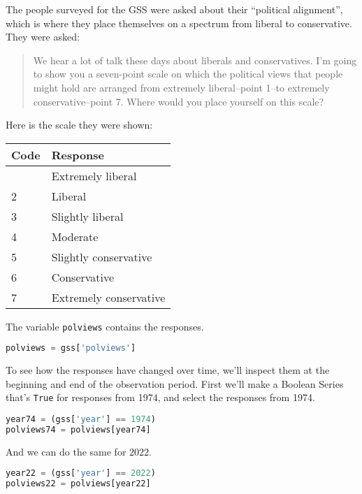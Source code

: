 The people surveyed for the GSS were asked about their ``political
alignment'', which is where they place themselves on a spectrum from
liberal to conservative. They were asked:

\begin{quote}
We hear a lot of talk these days about liberals and conservatives. I'm
going to show you a seven-point scale on which the political views that
people might hold are arranged from extremely liberal--point 1--to
extremely conservative--point 7. Where would you place yourself on this
scale?
\end{quote}

Here is the scale they were shown:

\begin{longtable}[]{ll}
\midrule
Code & Response \\
\midrule
\endhead
\midrule
\endlastfoot
1 & Extremely liberal \\
2 & Liberal \\
3 & Slightly liberal \\
4 & Moderate \\
5 & Slightly conservative \\
6 & Conservative \\
7 & Extremely conservative \\
\end{longtable}

The variable \passthrough{\lstinline!polviews!} contains the responses.

\begin{lstlisting}[language=Python,style=source]
polviews = gss['polviews']
\end{lstlisting}

To see how the responses have changed over time, we'll inspect them at
the beginning and end of the observation period. First we'll make a
Boolean Series that's \passthrough{\lstinline!True!} for responses from
1974, and select the responses from 1974.

\begin{lstlisting}[language=Python,style=source]
year74 = (gss['year'] == 1974)
polviews74 = polviews[year74]
\end{lstlisting}

And we can do the same for 2022.

\begin{lstlisting}[language=Python,style=source]
year22 = (gss['year'] == 2022)
polviews22 = polviews[year22]
\end{lstlisting}


